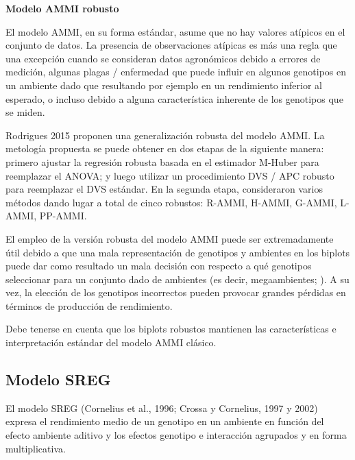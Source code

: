\textbf{Modelo AMMI robusto}

El modelo AMMI, en su forma estándar, asume que no hay valores atípicos en el conjunto de datos. La presencia de observaciones atípicas es más una regla que una excepción cuando se consideran datos agronómicos debido a errores de medición, algunas plagas / enfermedad que puede influir en algunos genotipos en un ambiente dado que resultando por ejemplo en un rendimiento inferior al esperado, o incluso debido a alguna característica inherente de los genotipos que se miden.

Rodrigues 2015 proponen una generalización robusta del modelo AMMI. La metología propuesta se puede obtener en dos etapas de la siguiente manera: primero ajustar la regresión robusta basada
en el estimador M-Huber \citep{Huber1981} para reemplazar el ANOVA; y luego utilizar un procedimiento DVS / APC robusto para reemplazar el DVS estándar. En la segunda etapa, consideraron varios métodos dando lugar a total de cinco robustos: R-AMMI, H-AMMI, G-AMMI, L-AMMI, PP-AMMI. 

El empleo de la versión robusta del modelo AMMI puede ser extremadamente útil debido a que una mala representación de genotipos y ambientes en los biplots puede dar como resultado un mala decisión con respecto a qué genotipos seleccionar para un conjunto dado de ambientes (es decir, megaambientes; \citealp{Gauch1997,Yanetal2000}). A su vez, la elección de los genotipos incorrectos pueden provocar grandes pérdidas en términos de producción de rendimiento.

Debe tenerse en cuenta que los biplots robustos mantienen las características e interpretación estándar del modelo AMMI clásico.

\subsection{Modelo SREG}

El modelo SREG (Cornelius et al., 1996; Crossa y Cornelius, 1997 y 2002) expresa el rendimiento medio de un genotipo en un ambiente en función del efecto ambiente aditivo y los efectos genotipo e interacción agrupados y en forma multiplicativa.


